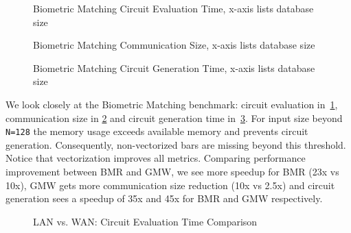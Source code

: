 

\begin{figure}[htbp]
\centering
\resizebox{0.7\columnwidth}{!}{}
\caption{Biometric Matching Circuit Evaluation Time, x-axis lists database size}
\label{fig:graph_biometric_eval_time}
\end{figure}

\begin{figure}[htbp]
\centering
\resizebox{0.7\columnwidth}{!}{}
\caption{Biometric Matching Communication Size, x-axis lists database size}
\label{fig:graph_biometic_comm_size}
\end{figure}

\begin{figure}[htbp]
\centering
\resizebox{0.7\columnwidth}{!}{}
\caption{Biometric Matching Circuit Generation Time, x-axis lists database size}
\label{fig:graph_biometic_circ_gen_time}
\end{figure}

We look closely at the Biometric Matching benchmark: circuit evaluation in~\cref{fig:graph_biometric_eval_time}, communication size in \cref{fig:graph_biometic_comm_size} and circuit generation time in~\cref{fig:graph_biometic_circ_gen_time}. For input size beyond {\tt N=128} the memory usage exceeds available memory and prevents circuit generation. Consequently, non-vectorized bars are missing beyond this threshold. Notice that vectorization improves all metrics. %
Comparing performance improvement between BMR and GMW, we see more speedup for BMR (23x vs 10x), GMW gets more communication size reduction (10x vs 2.5x) and circuit generation sees a speedup of 35x and 45x for BMR and GMW respectively. 



\begin{figure}[htbp]
\centering
\resizebox{0.7\columnwidth}{!}{}
\caption{LAN vs. WAN: Circuit Evaluation Time Comparison}
\label{fig:graph_comparison_eval_time}
\end{figure}

